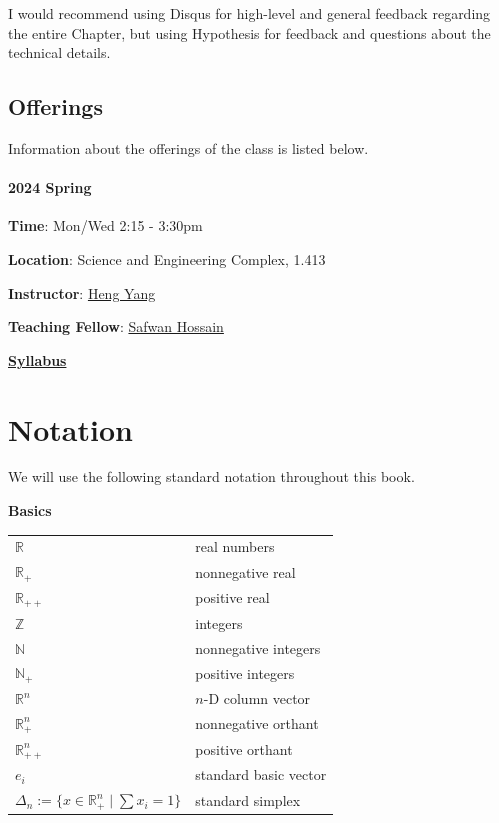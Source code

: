 \documentclass[
]{book}
\theoremstyle{definition}
\theoremstyle{definition}
\theoremstyle{definition}
\theoremstyle{definition}
\theoremstyle{remark}
\begin{document}
I would recommend using Disqus for high-level and general feedback regarding the entire Chapter, but using Hypothesis for feedback and questions about the technical details.

\section*{Offerings}\label{offerings}

Information about the offerings of the class is listed below.

\subsubsection*{2024 Spring}\label{spring}

\textbf{Time}: Mon/Wed 2:15 - 3:30pm

\textbf{Location}: Science and Engineering Complex, 1.413

\textbf{Instructor}: \href{https://hankyang.seas.harvard.edu/}{Heng Yang}

\textbf{Teaching Fellow}: \href{https://safwanhossain.github.io/}{Safwan Hossain}

\href{https://docs.google.com/document/d/1H6Wqht_PVw_n8Jl0kXN3HjZfHkeZJYqYWT4ayxvqRlU/edit?usp=sharing}{\textbf{Syllabus}}

\chapter*{Notation}\label{notation}

We will use the following standard notation throughout this book.

\textbf{Basics}

\begin{longtable}[]{@{}
  >{\raggedright\arraybackslash}p{}
  >{\raggedright\arraybackslash}p{}@{}}
\toprule\noalign{}
\endhead
\bottomrule\noalign{}
\endlastfoot
\(\mathbb{R}^{}\) & real numbers \\
\(\mathbb{R}^{}_{+}\) & nonnegative real \\
\(\mathbb{R}^{}_{++}\) & positive real \\
\(\mathbb{Z}\) & integers \\
\(\mathbb{N}\) & nonnegative integers \\
\(\mathbb{N}_{+}\) & positive integers \\
\(\mathbb{R}^{n}\) & \(n\)-D column vector \\
\(\mathbb{R}^{n}_{+}\) & nonnegative orthant \\
\(\mathbb{R}^{n}_{++}\) & positive orthant \\
\(e_i\) & standard basic vector \\
\(\Delta_n := \{x \in \mathbb{R}^n_{+} \mid \sum x_i = 1 \}\) & standard simplex \\
\end{longtable}
\end{document}
